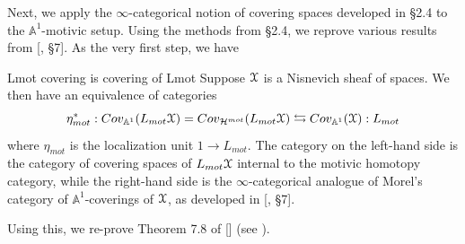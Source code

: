 Next, we apply the $\infty$-categorical notion of covering spaces developed in \S2.4 to the $\mathbb{A}^1$-motivic setup. Using the methods from \S2.4, we reprove various results from [\cite{morel2012a1}, \S7]. As the very first step, we have
\begin{recall*}{Lmot covering is covering of Lmot}
    Suppose $\EuScript{X}$ is a Nisnevich sheaf of spaces. We then have an equivalence of categories $$\eta^*_{mot}:Cov_{{\mathbb{A}^1}}({L_{mot}}\EuScript{X)}=Cov_{\mathcal{H}^{mot}}({L_{mot}}\EuScript{X)}\leftrightarrows  Cov_{{\mathbb{A}^1}}(\EuScript{X)}: L_{mot}$$ where $\eta_{mot}$ is the localization unit $1\to L_{mot}$. The category on the left-hand side is the category of covering spaces of $L_{mot}\EuScript{X}$ internal to the motivic homotopy category, while the right-hand side is the $\infty$-categorical analogue of Morel's category of $\mathbb{A}^1$-coverings of $\EuScript{X}$, as developed in \textup{[\cite{morel2012a1}, \S7]}.
\end{recall*}
Using this, we re-prove Theorem 7.8 of [\cite{morel2012a1}] (see ).

